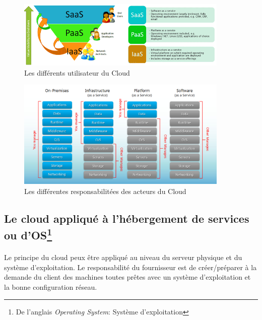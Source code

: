 \subsection*{} %

\begin{figure}[H]
\centering
\includegraphics[width=0.9\textwidth]{resource/img/clouds-users}
\caption{Les différents utilisateur du Cloud}
\end{figure}

\begin{figure}[H]
\centering
\includegraphics[width=0.9\textwidth]{resource/img/clouds-responsabilities}
\caption{Les différentes responsabilitées des acteurs du Cloud}
\end{figure}

\subsection{Le cloud appliqué à l'hébergement de services ou d'OS\protect\footnote{De l'anglais \textit{Operating System}: Système d'exploitation}}
\paragraph*{}
Le principe du cloud peux être appliqué au niveau du serveur physique et du système d'exploitation. Le responsabilité du fournisseur est de créer/préparer
à la demande du client des machines toutes prêtes avec un système d'exploitation et la bonne configuration réseau.

